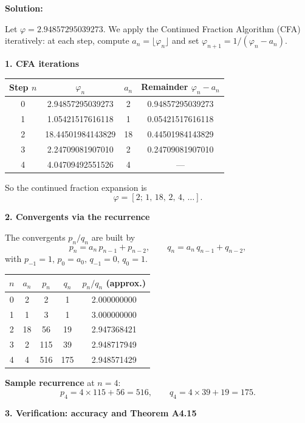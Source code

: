 \documentclass[11pt]{article}
\newenvironment{solution}
{\par\noindent\textbf{Solution:}\par}
{\vspace{1em}}
\begin{document}
\begin{solution}
Let \(\varphi = 2.94857295039273\). We apply the Continued Fraction Algorithm (CFA) iteratively: at each step, compute \(a_n = \lfloor \varphi_n \rfloor\) and set \(\varphi_{n+1} = 1/(\varphi_n - a_n)\).

\textbf{1. CFA iterations}

\begin{center}
\begin{tabular}{cccc}
\toprule
Step $n$ & $\varphi_n$ & $a_n$ & Remainder $\varphi_n - a_n$ \\
\midrule
0 & 2.94857295039273 & 2 & 0.94857295039273 \\
1 & 1.05421517616118 & 1 & 0.05421517616118 \\
2 & 18.44501984143829 & 18 & 0.44501984143829 \\
3 & 2.24709081907010 & 2 & 0.24709081907010 \\
4 & 4.04709492551526 & 4 & --- \\
\bottomrule
\end{tabular}
\end{center}

So the continued fraction expansion is\[\varphi = [2;\,1,\,18,\,2,\,4,\,\ldots].\]

\textbf{2. Convergents via the recurrence}

The convergents \(p_n/q_n\) are built by
\[p_n = a_n\,p_{n-1} + p_{n-2}, \qquad q_n = a_n\,q_{n-1} + q_{n-2},\]
with \(p_{-1}=1,\,p_0=a_0,\,q_{-1}=0,\,q_0=1\).

\begin{center}
\begin{tabular}{ccccc}
\toprule
$n$ & $a_n$ & $p_n$ & $q_n$ & $p_n/q_n$ (approx.) \\
\midrule
0 & 2  & 2   & 1   & 2.000000000 \\
1 & 1  & 3   & 1   & 3.000000000 \\
2 & 18 & 56  & 19  & 2.947368421 \\
3 & 2  & 115 & 39  & 2.948717949 \\
4 & 4  & 516 & 175 & 2.948571429 \\
\bottomrule
\end{tabular}
\end{center}

\textbf{Sample recurrence} at $n=4$:
\[p_4 = 4 \times 115 + 56 = 516, \qquad q_4 = 4 \times 39 + 19 = 175.\]

\textbf{3. Verification: accuracy and Theorem A4.15}


\end{solution}
\end{document}
